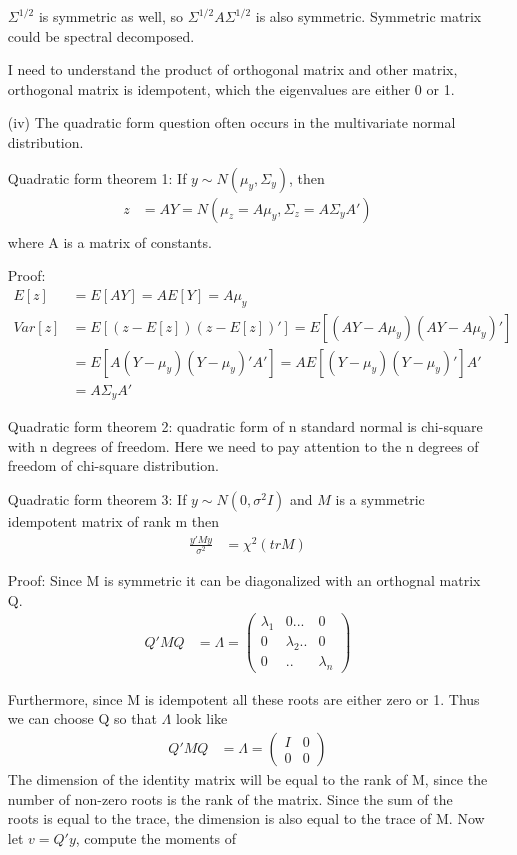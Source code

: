 \documentclass[11pt]{article} %
\begin{document}
\begin{itemize}
$\Sigma^{1/2}$ is symmetric as well, so $\Sigma^{1/2} A \Sigma^{1/2} $ is also symmetric. Symmetric matrix could be spectral decomposed.





I need to understand the product of orthogonal matrix and other matrix, orthogonal matrix is idempotent, which the eigenvalues are either 0 or 1.



\item[(iv)] The quadratic form question often occurs in the multivariate normal distribution.

Quadratic form theorem 1:
If $y \sim N(\mu_y, \Sigma_y)$, then 
\begin{align*}
	z &= A Y = N( \mu_z = A \mu_y, \Sigma_z = A \Sigma_y A')\\
\end{align*}	
where A is a matrix of constants.

Proof:
\begin{align*}
	E[z] &= E[A Y ]= AE[Y] = A \mu_y\\
	Var[z] &= E[(z-E[z]) (z-E[z])'] = E[(AY - A \mu_y) (AY - A \mu_y)'] \\
	&= E[A(Y -  \mu_y) (Y -  \mu_y)' A'] = A E[(Y -  \mu_y) (Y -  \mu_y)' ]A' \\
	&= A \Sigma_y A' 
\end{align*}	

Quadratic form theorem 2: quadratic form of n standard normal is chi-square with n degrees of freedom.
Here we need to pay attention to the n degrees of freedom of chi-square distribution.


Quadratic form theorem 3: 
If $y \sim N(0, \sigma^2 I)$ and $M$ is a symmetric idempotent matrix of rank m then
\begin{align*}
	\frac{y' M y}{\sigma^2} &= \chi^2(tr M) 
\end{align*}	

Proof: Since M is symmetric it can be diagonalized with an orthognal matrix Q. 
\begin{align*}
	Q'M Q &= \Lambda = \begin{pmatrix}
		\lambda_1 & 0... & 0 \\
		0 & \lambda_2.. & 0\\
		0&.. &\lambda_n
	\end{pmatrix}
\end{align*}	

Furthermore, since M is idempotent all these roots are either zero or 1. Thus we can choose Q so that $\Lambda$ look like
\begin{align*}
	Q' M Q &= \Lambda = \begin{pmatrix}
		I & 0 \\
		0 & 0
	\end{pmatrix}
\end{align*}	
The dimension of the identity matrix will be equal to the rank of M, since the number of non-zero roots is the rank of the matrix. Since the sum of the roots is equal to the trace, the dimension is also equal to the trace of M. Now let $v= Q'y$, compute the moments of 


\end{itemize}
\end{document}
